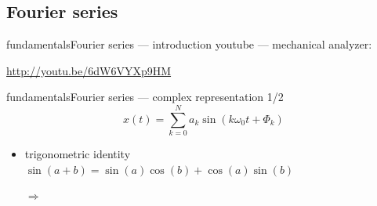         \subsection{Fourier series}

\begin{frame}{fundamentals}{Fourier series --- introduction}
    youtube --- mechanical analyzer:
    
    \url{http://youtu.be/6dW6VYXp9HM}
\end{frame}
\begin{frame}{fundamentals}{Fourier series --- complex representation 1/2}
    \begin {equation}
        x(t) = \sum\limits_{k=0}^{N} a_k \sin(k\omega_0 t + \Phi_k) \nonumber
    \end {equation}
    \pause
    \begin{itemize}
        \item   trigonometric identity $\sin(a+b) = \sin(a)\cos(b) + \cos(a)\sin(b)$
        \item[$\Rightarrow$]
    \end{itemize}
\end{frame}
